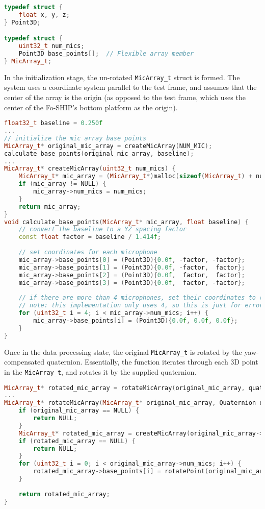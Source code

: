 \documentclass[11pt]{ucthesisCP}
\begin{document}
\begin{lstlisting}[language=C++]
typedef struct {
	float x, y, z;
} Point3D;

typedef struct {
	uint32_t num_mics;
	Point3D base_points[];  // Flexible array member
} MicArray_t;
\end{lstlisting}

In the initialization stage, the un-rotated \verb|MicArray_t| struct is formed. The system uses a coordinate system parallel to the test frame, and assumes that the center of the array is the origin (as opposed to the test frame, which uses the center of the Fo-SHIP's bottom platform as the origin).

\begin{lstlisting}[language=C++]
float32_t baseline = 0.250f
...
// initialize the mic array base points
MicArray_t* original_mic_array = createMicArray(NUM_MIC);
calculate_base_points(original_mic_array, baseline);
...
MicArray_t* createMicArray(uint32_t num_mics) {
	MicArray_t* mic_array = (MicArray_t*)malloc(sizeof(MicArray_t) + num_mics * sizeof(Point3D));
	if (mic_array != NULL) {
		mic_array->num_mics = num_mics;
	}
	return mic_array;
}
void calculate_base_points(MicArray_t* mic_array, float baseline) {
	// convert the baseline to a YZ spacing factor
	const float factor = baseline / 1.414f;
	
	// set coordinates for each microphone
	mic_array->base_points[0] = (Point3D){0.0f, -factor, -factor};
	mic_array->base_points[1] = (Point3D){0.0f, -factor,  factor};
	mic_array->base_points[2] = (Point3D){0.0f,  factor,  factor};
	mic_array->base_points[3] = (Point3D){0.0f,  factor, -factor};
	
	// if there are more than 4 microphones, set their coordinates to (0,0,0)
	// note: this implementation only uses 4, so this is just for error catching
	for (uint32_t i = 4; i < mic_array->num_mics; i++) {
		mic_array->base_points[i] = (Point3D){0.0f, 0.0f, 0.0f};
	}
}
\end{lstlisting}

Once in the data processing state, the original \verb|MicArray_t| is rotated by the yaw-compensated quaternion. Essentially, the function iterates through each 3D point in the \verb|MicArray_t|, and rotates it by the supplied quaternion.

\begin{lstlisting}[language=C++]
MicArray_t* rotated_mic_array = rotateMicArray(original_mic_array, quat);
...
MicArray_t* rotateMicArray(MicArray_t* original_mic_array, Quaternion quat) {
	if (original_mic_array == NULL) {
		return NULL;
	}
	MicArray_t* rotated_mic_array = createMicArray(original_mic_array->num_mics);
	if (rotated_mic_array == NULL) {
		return NULL;
	}
	for (uint32_t i = 0; i < original_mic_array->num_mics; i++) {
		rotated_mic_array->base_points[i] = rotatePoint(original_mic_array->base_points[i], quat);
	}
	
	return rotated_mic_array;
}
\end{lstlisting}
\end{document}

